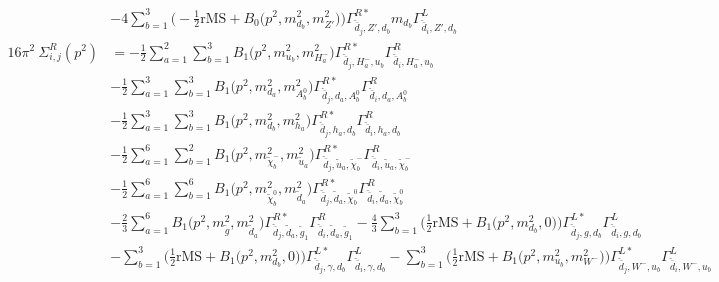 \begin{itemize}
\begin{align}
 &-4 \sum_{b=1}^{3}\Big(-\frac{1}{2} \text{rMS}  + {B_0\Big(p^{2},m^2_{d_{{b}}},m^2_{{Z'}}\Big)}\Big){\Gamma^{R*}_{\check{\bar{d}}_{{j}},{Z'},d_{{b}}}} m_{d_{{b}}} {\Gamma^L_{\check{\bar{d}}_{{i}},{Z'},d_{{b}}}}  \\ 
16\pi^2 \ \Sigma^R_{i,j}(p^2) &= -\frac{1}{2} \sum_{a=1}^{2}\sum_{b=1}^{3}{B_1\Big(p^{2},m^2_{u_{{b}}},m^2_{H^-_{{a}}}\Big)} {\Gamma^{R*}_{\check{\bar{d}}_{{j}},H^-_{{a}},u_{{b}}}} {\Gamma^R_{\check{\bar{d}}_{{i}},H^-_{{a}},u_{{b}}}}  \nonumber \\ 
 &-\frac{1}{2} \sum_{a=1}^{3}\sum_{b=1}^{3}{B_1\Big(p^{2},m^2_{d_{{a}}},m^2_{A^0_{{b}}}\Big)} {\Gamma^{R*}_{\check{\bar{d}}_{{j}},d_{{a}},A^0_{{b}}}} {\Gamma^R_{\check{\bar{d}}_{{i}},d_{{a}},A^0_{{b}}}}  \nonumber \\ 
 &-\frac{1}{2} \sum_{a=1}^{3}\sum_{b=1}^{3}{B_1\Big(p^{2},m^2_{d_{{b}}},m^2_{h_{{a}}}\Big)} {\Gamma^{R*}_{\check{\bar{d}}_{{j}},h_{{a}},d_{{b}}}} {\Gamma^R_{\check{\bar{d}}_{{i}},h_{{a}},d_{{b}}}}  \nonumber \\ 
 &-\frac{1}{2} \sum_{a=1}^{6}\sum_{b=1}^{2}{B_1\Big(p^{2},m^2_{\tilde{\chi}^-_{{b}}},m^2_{\tilde{u}_{{a}}}\Big)} {\Gamma^{R*}_{\check{\bar{d}}_{{j}},\tilde{u}_{{a}},\tilde{\chi}^-_{{b}}}} {\Gamma^R_{\check{\bar{d}}_{{i}},\tilde{u}_{{a}},\tilde{\chi}^-_{{b}}}}  \nonumber \\ 
 &-\frac{1}{2} \sum_{a=1}^{6}\sum_{b=1}^{6}{B_1\Big(p^{2},m^2_{\tilde{\chi}^0_{{b}}},m^2_{\tilde{d}_{{a}}}\Big)} {\Gamma^{R*}_{\check{\bar{d}}_{{j}},\tilde{d}_{{a}},\tilde{\chi}^0_{{b}}}} {\Gamma^R_{\check{\bar{d}}_{{i}},\tilde{d}_{{a}},\tilde{\chi}^0_{{b}}}}  \nonumber \\ 
 &-\frac{2}{3} \sum_{a=1}^{6}{B_1\Big(p^{2},m^2_{\tilde{g}},m^2_{\tilde{d}_{{a}}}\Big)} {\Gamma^{R*}_{\check{\bar{d}}_{{j}},\tilde{d}_{{a}},\tilde{g}_{{1}}}} {\Gamma^R_{\check{\bar{d}}_{{i}},\tilde{d}_{{a}},\tilde{g}_{{1}}}}  -\frac{4}{3} \sum_{b=1}^{3}\Big(\frac{1}{2} \text{rMS}  + {B_1\Big(p^{2},m^2_{d_{{b}}},0\Big)}\Big){\Gamma^{L*}_{\check{\bar{d}}_{{j}},g,d_{{b}}}} {\Gamma^L_{\check{\bar{d}}_{{i}},g,d_{{b}}}}  \nonumber \\ 
 &- \sum_{b=1}^{3}\Big(\frac{1}{2} \text{rMS}  + {B_1\Big(p^{2},m^2_{d_{{b}}},0\Big)}\Big){\Gamma^{L*}_{\check{\bar{d}}_{{j}},\gamma,d_{{b}}}} {\Gamma^L_{\check{\bar{d}}_{{i}},\gamma,d_{{b}}}}  - \sum_{b=1}^{3}\Big(\frac{1}{2} \text{rMS}  + {B_1\Big(p^{2},m^2_{u_{{b}}},m^2_{W^-}\Big)}\Big){\Gamma^{L*}_{\check{\bar{d}}_{{j}},W^-,u_{{b}}}} {\Gamma^L_{\check{\bar{d}}_{{i}},W^-,u_{{b}}}}  \nonumber \\ 

\end{align}
\end{itemize}
